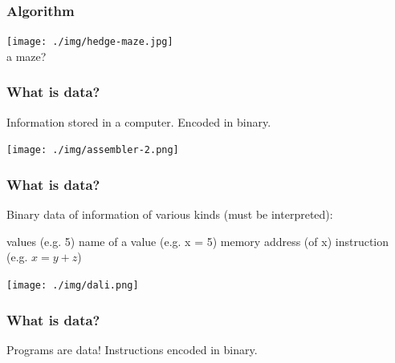 \documentclass[11pt]{beamer}
\begin{document}
\begin{frame}[fragile]
  \frametitle{Algorithm}

  \texttt{[image: ./img/hedge-maze.jpg]}
  \\a maze?
\end{frame}

\fi

\begin{frame}
  \frametitle{What is data?}
  \Enlarge

  \begin{itemize} \pause
    \myitem Information stored in a computer. \pause
    \myitem Encoded in binary.
  \end{itemize}
  \texttt{[image: ./img/assembler-2.png]}
\end{frame}

\begin{frame}
  \frametitle{What is data?}
  \Enlarge

  \begin{itemize}
    \myitem Binary data of information of various kinds (must be interpreted):
	\begin{itemize}
	  \mysubitem values (e.g. 5) %
	  \mysubitem name of a value (e.g. x = 5) %
	  \mysubitem memory address (of x) %
	  \mysubitem instruction (e.g. $x = y + z$) %
	\end{itemize}
  \end{itemize}
  \begin{centering}
  \hspace{15mm}\texttt{[image: ./img/dali.png]}
  \end{centering}
\end{frame}

\begin{frame}
  \frametitle{What is data?}
  \Enlarge

  \begin{itemize} 
      \myitem Programs are data! \pause
      \myitem Instructions encoded in binary.
  \end{itemize}
\end{frame}

\end{document}
